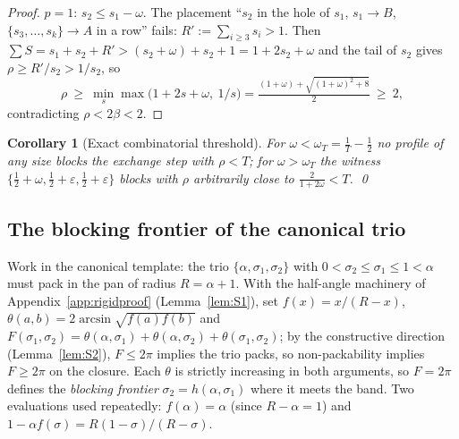 \documentclass[11pt]{article}
\newtheorem{corollary}[theorem]{Corollary}
\theoremstyle{definition}
\begin{document}
\begin{proof}
$p=1$: $s_2\le s_1-\omega$. The placement ``$s_2$ in the hole of $s_1$,
$s_1\to B$, $\{s_3,\dots,s_k\}\to A$ in a row'' fails:
$R':=\sum_{i\ge3}s_i>1$. Then
$\sum S=s_1+s_2+R'>(s_2+\omega)+s_2+1=1+2s_2+\omega$ and the tail of $s_2$
gives $\rho\ge R'/s_2>1/s_2$, so
\[
\rho\ \ge\ \min_s\max\bigl(1+2s+\omega,\ 1/s\bigr)
=\tfrac{(1+\omega)+\sqrt{(1+\omega)^2+8}}{2}\ \ge\ 2,
\]
contradicting $\rho<2\beta<2$.
\end{proof}

\begin{corollary}[Exact combinatorial threshold]\label{cor:Comegac}
For $\omega<\omega_T=\tfrac1T-\tfrac12$ no profile of any size blocks the
exchange step with $\rho<T$; for $\omega>\omega_T$ the witness
$\{\tfrac12+\omega,\tfrac12+\varepsilon,\tfrac12+\varepsilon\}$ blocks with
$\rho$ arbitrarily close to $\tfrac{2}{1+2\omega}<T$. \qed
\end{corollary}

\subsection{The blocking frontier of the canonical trio}\label{app:frontier}

Work in the canonical template: the trio $\{\alpha,\sigma_1,\sigma_2\}$
with $0<\sigma_2\le\sigma_1\le1<\alpha$ must pack in the pan of radius
$R=\alpha+1$. With the half-angle machinery of Appendix~\ref{app:rigidproof}
(Lemma~\ref{lem:S1}), set $f(x)=x/(R-x)$,
$\theta(a,b)=2\arcsin\sqrt{f(a)f(b)}$ and
$F(\sigma_1,\sigma_2)=\theta(\alpha,\sigma_1)+\theta(\alpha,\sigma_2)
+\theta(\sigma_1,\sigma_2)$; by the constructive direction
(Lemma~\ref{lem:S2}), $F\le2\pi$ implies the trio packs, so
non-packability implies $F\ge2\pi$ on the closure. Each $\theta$ is
strictly increasing in both arguments, so $F=2\pi$ defines the
\emph{blocking frontier} $\sigma_2=h(\alpha,\sigma_1)$ where it meets the
band. Two evaluations used repeatedly: $f(\alpha)=\alpha$ (since
$R-\alpha=1$) and $1-\alpha f(\sigma)=R(1-\sigma)/(R-\sigma)$.
\end{document}
